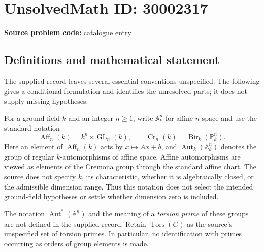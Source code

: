\documentclass[11pt]{article}
\begin{document}
\section*{UnsolvedMath ID: 30002317}
\textbf{Source problem code:} catalogue entry
\subsection{Definitions and mathematical statement}
The supplied record leaves several essential conventions unspecified. The following gives a conditional formulation and identifies the unresolved parts; it does not supply missing hypotheses.

For a ground field \(k\) and an integer \(n\geq 1\), write \(\mathbb A_k^n\) for affine \(n\)-space and use the standard notation
\[
\operatorname{Aff}_n(k)=k^n\rtimes\operatorname{GL}_n(k),\qquad
\operatorname{Cr}_n(k)=\operatorname{Bir}_k(\mathbb P_k^n).
\]
Here an element of \(\operatorname{Aff}_n(k)\) acts by \(x\mapsto Ax+b\), and \(\operatorname{Aut}_k(\mathbb A_k^n)\) denotes the group of regular \(k\)-automorphisms of affine space. Affine automorphisms are viewed as elements of the Cremona group through the standard affine chart. The source does not specify \(k\), its characteristic, whether it is algebraically closed, or the admissible dimension range. Thus this notation does not select the intended ground-field hypotheses or settle whether dimension zero is included.

The notation \(\operatorname{Aut}^*(\mathbb A^n)\) and the meaning of a \emph{torsion prime} of these groups are not defined in the supplied record. Retain \(\operatorname{Tors}(G)\) as the source's unspecified set of torsion primes. In particular, no identification with primes occurring as orders of group elements is made.
\end{document}
